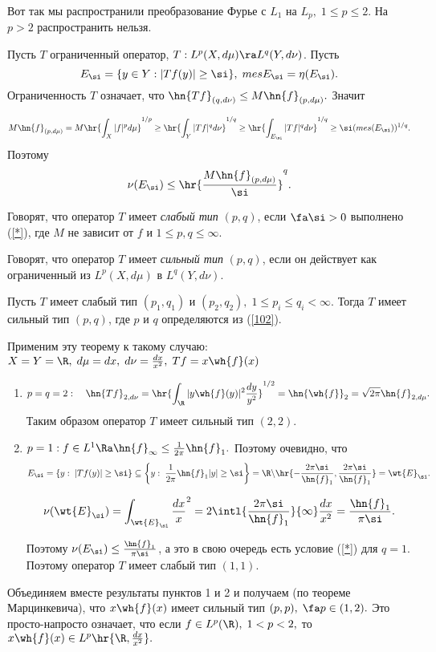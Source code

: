 \documentclass{article}
\begin{document}
Вот так мы распространили преобразование Фурье с $L_1$ на $L_p,\;1\le p \le 2$. На $p>2$ распространить
нельзя.

Пусть $T$ ограниченный оператор, $T:L^p(X,d\mu)\ra L^q(Y,d\nu)$. Пусть
$$E_{\si}=\{y\in Y:|Tf(y)|\ge\si\},\;mes E_{\si}=\eta(E_{\si}).$$ Ограниченность $T$ означает, что
$\hn{Tf}_{(q,d\nu)}\le M\hn{f}_{(p,d\mu)}.$ Значит

$$M\hn{f}_{(p,d\mu)}=M\hr{\int_X |f|^pd\mu}^{1/p}\ge \hr{\int_Y |Tf|^qd\nu}^{1/q}\ge
\hr{\int_{E_{\si}} |Tf|^qd\nu}^{1/q}\ge\si(mes(E_{\si}))^{1/q}.$$ Поэтому
\begin{equation}\label{*}
\nu(E_{\si})\le\hr{\frac{M\hn{f}_{(p,d\mu)}}{\si}}^q.
\end{equation}

\begin{df}
  Говорят, что оператор $T$ имеет \emph{слабый тип} $(p,q)$, если $\fa\si>0$
  выполнено (\ref{*}), где $M$ не зависит от $f$ и $1\le p,q\le\infty.$
\end{df}

\begin{df}
  Говорят, что оператор $T$ имеет \emph{сильный тип} $(p,q)$, если он действует как
  ограниченный из $L^p(X,d\mu)$ в $L^q(Y,d\nu).$
\end{df}

\begin{theorem}[Марцинкевич] Пусть $T$ имеет слабый тип
$(p_1,q_1)$ и $(p_2,q_2),\;1\le p_i\le q_i<\infty$. Тогда $T$ имеет сильный тип $(p,q)$, где $p$ и $q$
определяются из (\ref{102}).
\end{theorem}

Применим эту теорему к такому случаю: $X=Y=\R ,\;d\mu=dx,\;d\nu=\frac{dx}{x^2},\;Tf=x\wh{f}(x)$
\begin{enumerate}
\item
$$p=q=2:\quad\hn{Tf}_{2,d\nu}=\hr{\int_{\R }|y\wh{f}(y)|^2\frac{dy}{y^2}}^{1/2}=\hn{\wh{f}}_2=\sqrt{2\pi}\hn{f}_{2,d\mu}.$$
Таким образом оператор $T$ имеет сильный тип $(2,2).$
\item
$p=1: f\in L^1\Ra\hn{f}_{\infty}\le\frac1{2\pi}\hn{f}_1.$ Поэтому очевидно, что
$$E_{\si}=\{y:\;|Tf(y)|\ge\si\}\subseteq\left\{y:\;\frac1{2\pi}\hn{f}_1|y|\ge\si\right\}=\R \backslash\hr{-\frac{2\pi\si}{\hn{f}_1},\frac{2\pi\si}{\hn{f}_1}}=\wt{E}_{\si}.$$

$$\nu(\wt{E}_{\si})=\int_{\wt{E}_{\si}}\frac{dx}x^2=2\intl{\frac{2\pi\si}{\hn{f}_1}}{\infty}\frac{dx}{x^2}=\frac{\hn{f}_1}{\pi\si}.$$

Поэтому $\nu(E_{\si})\le\frac{\hn{f}_1}{\pi\si}$, а это в свою очередь есть условие (\ref{*}) для
$q=1.$ Поэтому оператор $T$ имеет слабый тип $(1,1).$
\end{enumerate}
Объединяем вместе результаты пунктов 1 и 2 и получаем (по теореме Марцинкевича), что $x\wh{f}(x)$ имеет
сильный тип $(p,p),\;\fa p\in(1,2).$ Это просто-напросто означает, что если $f\in
L^p(\R ),\;1<p<2,$ то $x\wh{f}(x)\in L^p\hr{\R ,\frac{dx}{x^2}}.$
\end{document}
